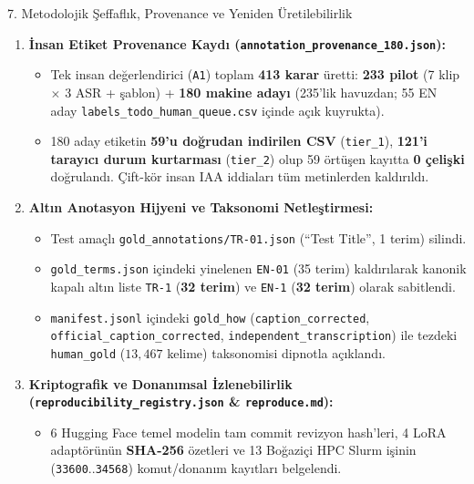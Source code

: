 \documentclass[aspectratio=169,10pt]{beamer}
\begin{document}
\begin{frame}{7. Metodolojik Şeffaflık, Provenance ve Yeniden Üretilebilirlik}
\scriptsize
\begin{enumerate}
    \item \textbf{İnsan Etiket Provenance Kaydı (\texttt{annotation\_provenance\_180.json}):}
    \begin{itemize}
        \item Tek insan değerlendirici (\texttt{A1}) toplam \textbf{413 karar} üretti: \textbf{233 pilot} (7 klip $\times$ 3 ASR + şablon) + \textbf{180 makine adayı} (235'lik havuzdan; 55 EN aday \texttt{labels\_todo\_human\_queue.csv} içinde açık kuyrukta).
        \item 180 aday etiketin \textbf{59'u doğrudan indirilen CSV} (\texttt{tier\_1}), \textbf{121'i tarayıcı durum kurtarması} (\texttt{tier\_2}) olup 59 örtüşen kayıtta \textbf{0 çelişki} doğrulandı. Çift-kör insan IAA iddiaları tüm metinlerden kaldırıldı.
    \end{itemize}
    \item \textbf{Altın Anotasyon Hijyeni ve Taksonomi Netleştirmesi:}
    \begin{itemize}
        \item Test amaçlı \texttt{gold\_annotations/TR-01.json} (``Test Title'', 1 terim) silindi.
        \item \texttt{gold\_terms.json} içindeki yinelenen \texttt{EN-01} (35 terim) kaldırılarak kanonik kapalı altın liste \texttt{TR-1} (\textbf{32 terim}) ve \texttt{EN-1} (\textbf{32 terim}) olarak sabitlendi.
        \item \texttt{manifest.jsonl} içindeki \texttt{gold\_how} (\texttt{caption\_corrected}, \texttt{official\_caption\_corrected}, \texttt{independent\_transcription}) ile tezdeki \texttt{human\_gold} ($13{,}467$ kelime) taksonomisi dipnotla açıklandı.
    \end{itemize}
    \item \textbf{Kriptografik ve Donanımsal İzlenebilirlik (\texttt{reproducibility\_registry.json} \& \texttt{reproduce.md}):}
    \begin{itemize}
        \item 6 Hugging Face temel modelin tam commit revizyon hash'leri, 4 LoRA adaptörünün \textbf{SHA-256} özetleri ve 13 Boğaziçi HPC Slurm işinin (\texttt{33600}..\texttt{34568}) komut/donanım kayıtları belgelendi.
    \end{itemize}
\end{enumerate}
\end{frame}
\end{document}
